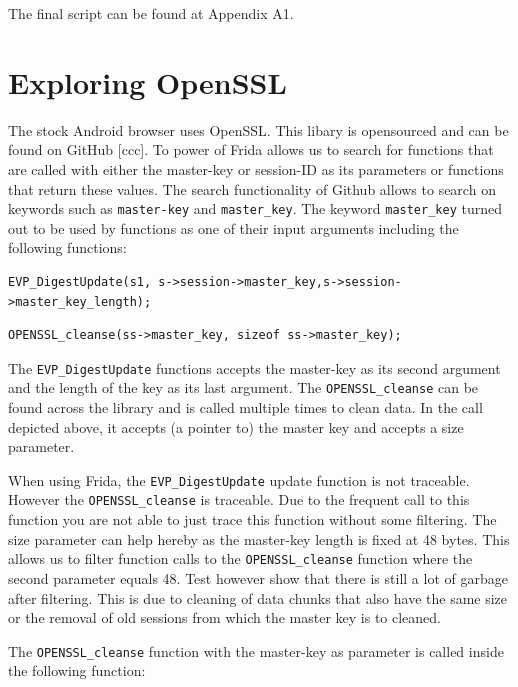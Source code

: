 \documentclass[12pt, a4paper]{report}
\begin{document}
The final script can be found at Appendix A1.
\clearpage

\section{Exploring OpenSSL}
The stock Android browser uses OpenSSL. This libary is opensourced and can be found on GitHub [ccc]. To power of Frida allows us to search for functions that are called with either the master-key or session-ID as its parameters or functions that return these values. The search functionality of Github allows to search on keywords such as \texttt{master-key} and \texttt{master\_key}. The keyword \texttt{master\_key} turned out to be used by functions as one of their input arguments including the following functions:

\begin{lstlisting}[frame=single, breaklines=true]
EVP_DigestUpdate(s1, s->session->master_key,s->session->master_key_length);
\end{lstlisting}

\begin{lstlisting}[frame=single, breaklines=true]
OPENSSL_cleanse(ss->master_key, sizeof ss->master_key);
\end{lstlisting}

The \texttt{EVP\_DigestUpdate} functions accepts the master-key as its second argument and the length of the key as its last argument. The \texttt{OPENSSL\_cleanse} can be found across the library and is called multiple times to clean data. In the call depicted above, it accepts (a pointer to) the master key and accepts a size parameter. 

When using Frida, the \texttt{EVP\_DigestUpdate} update function is not traceable. However the \texttt{OPENSSL\_cleanse} is traceable. Due to the frequent call to this function you are not able to just trace this function without some filtering. The size parameter can help hereby as the master-key length is fixed at 48 bytes. This allows us to filter function calls to the \texttt{OPENSSL\_cleanse} function where the second parameter equals 48. Test however show that there is still a lot of garbage after filtering. This is due to cleaning of data chunks that also have the same size or the removal of old sessions from which the master key is to cleaned. 


\noindent The \texttt{OPENSSL\_cleanse} function with the master-key as parameter is called inside the following function:
\end{document}

